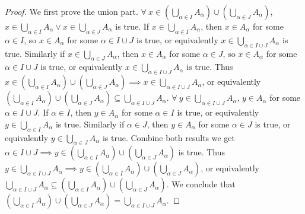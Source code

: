 \begin{proof}
We first prove the union part.
\(\forall\ x \in (\bigcup_{\alpha \in I} A_{\alpha}) \cup (\bigcup_{\alpha \in J} A_{\alpha})\), \(x \in \bigcup_{\alpha \in I} A_{\alpha} \lor x \in \bigcup_{\alpha \in J} A_{\alpha}\) is true.
If \(x \in \bigcup_{\alpha \in I} A_{\alpha}\), then \(x \in A_{\alpha}\) for some \(\alpha \in I\), so \(x \in A_{\alpha}\) for some \(\alpha \in I \cup J\) is true, or equivalently \(x \in \bigcup_{\alpha \in I \cup J} A_{\alpha}\) is true.
Similarly if \(x \in \bigcup_{\alpha \in J} A_{\alpha}\), then \(x \in A_{\alpha}\) for some \(\alpha \in J\), so \(x \in A_{\alpha}\) for some \(\alpha \in I \cup J\) is true, or equivalently \(x \in \bigcup_{\alpha \in I \cup J} A_{\alpha}\) is true.
Thus \(x \in (\bigcup_{\alpha \in I} A_{\alpha}) \cup (\bigcup_{\alpha \in J} A_{\alpha}) \implies x \in \bigcup_{\alpha \in I \cup J} A_{\alpha}\), or equivalently \((\bigcup_{\alpha \in I} A_{\alpha}) \cup (\bigcup_{\alpha \in J} A_{\alpha}) \subseteq \bigcup_{\alpha \in I \cup J} A_{\alpha}\).
\(\forall\ y \in \bigcup_{\alpha \in I \cup J} A_{\alpha}\), \(y \in A_{\alpha}\) for some \(\alpha \in I \cup J\).
If \(\alpha \in I\), then \(y \in A_{\alpha}\) for some \(\alpha \in I\) is true, or equivalently \(y \in \bigcup_{\alpha \in I} A_{\alpha}\) is true.
Similarly if \(\alpha \in J\), then \(y \in A_{\alpha}\) for some \(\alpha \in J\) is true, or equivalently \(y \in \bigcup_{\alpha \in J} A_{\alpha}\) is true.
Combine both results we get \(\alpha \in I \cup J \implies y \in (\bigcup_{\alpha \in I} A_{\alpha}) \cup (\bigcup_{\alpha \in J} A_{\alpha})\) is true.
Thus \(y \in \bigcup_{\alpha \in I \cup J} A_{\alpha} \implies y \in (\bigcup_{\alpha \in I} A_{\alpha}) \cup (\bigcup_{\alpha \in J} A_{\alpha})\), or equivalently \(\bigcup_{\alpha \in I \cup J} A_{\alpha} \subseteq (\bigcup_{\alpha \in I} A_{\alpha}) \cup (\bigcup_{\alpha \in J} A_{\alpha})\).
We conclude that \((\bigcup_{\alpha \in I} A_{\alpha}) \cup (\bigcup_{\alpha \in J} A_{\alpha}) = \bigcup_{\alpha \in I \cup J} A_{\alpha}\).


\end{proof}
